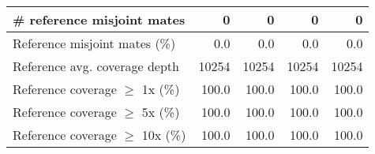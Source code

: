 \documentclass[12pt,a4paper]{article}
\begin{document}
\begin{table}[ht]
\begin{center}
\begin{tabular}{|l*{4}{|r}|}
\# reference misjoint mates & 0 & 0 & 0 & 0 \\ \hline
Reference misjoint mates (\%) & 0.0 & 0.0 & 0.0 & 0.0 \\ \hline
Reference avg. coverage depth & 10254 & 10254 & 10254 & 10254 \\ \hline
Reference coverage $\geq$ 1x (\%) & 100.0 & 100.0 & 100.0 & 100.0 \\ \hline
Reference coverage $\geq$ 5x (\%) & 100.0 & 100.0 & 100.0 & 100.0 \\ \hline
Reference coverage $\geq$ 10x (\%) & 100.0 & 100.0 & 100.0 & 100.0 \\ \hline
\end{tabular}
\end{center}
\end{table}
\end{document}
